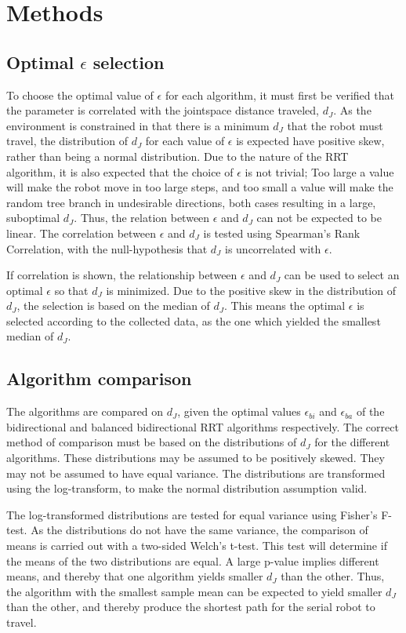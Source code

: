 \section{Methods}
\subsection{Optimal \(\epsilon\) selection}
To choose the optimal value of \(\epsilon\) for each algorithm,
it must first be verified that the parameter is correlated
with the jointspace distance traveled, \(d_J\).
As the environment is constrained in that there is a minimum \(d_J\)
that the robot must travel, the distribution of \(d_J\) for each
value of \(\epsilon\) is expected have positive skew,
rather than being a normal distribution.
Due to the nature of the RRT algorithm, it is also expected that
the choice of \(\epsilon\) is not trivial;
Too large a value will make the robot move in too large steps,
and too small a value will make the random tree branch in
undesirable directions, both cases resulting in a large, suboptimal \(d_J\).
Thus, the relation between \(\epsilon\) and \(d_J\) can not be expected to be linear.
The correlation between \(\epsilon\) and \(d_J\) is tested using
Spearman's Rank Correlation, with the null-hypothesis that \(d_J\)
is uncorrelated with \(\epsilon\).

If correlation is shown, the relationship
between \(\epsilon\) and \(d_J\) can be used
to select an optimal \(\epsilon\) so that
\(d_J\) is minimized.
Due to the positive skew in the distribution
of \(d_J\), the selection is based on the median
of \(d_J\).
This means the optimal \(\epsilon\) is selected
according to the collected data,
as the one which yielded the smallest median of \(d_J\).

\subsection{Algorithm comparison}
The algorithms are compared on \(d_J\),
given the optimal values \(\epsilon_{bi}\) and \(\epsilon_{ba}\)
of the bidirectional and balanced bidirectional RRT algorithms respectively.
The correct method of comparison must be based
on the distributions of \(d_J\) for the different algorithms.
These distributions may be assumed to be positively skewed.
They may not be assumed to have equal variance.
The distributions are transformed using the log-transform,
to make the normal distribution assumption valid.

The log-transformed distributions are tested for equal variance
using Fisher's F-test.
As the distributions do not have the same variance,
the comparison of means is carried out with a two-sided Welch's t-test.
This test will determine if the means of the two distributions are equal.
A large p-value implies different means, and thereby that one algorithm
yields smaller \(d_J\) than the other.
Thus, the algorithm with the smallest sample mean can be expected
to yield smaller \(d_J\) than the other, and thereby produce the shortest
path for the serial robot to travel.